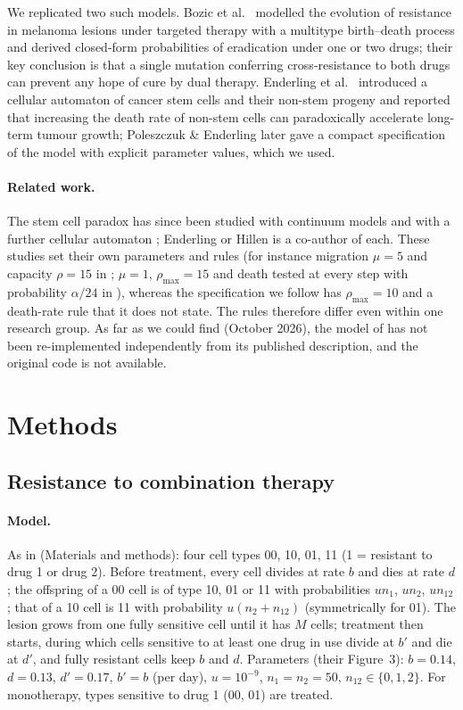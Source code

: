 \documentclass[11pt]{article}
\begin{document}
We replicated two such models. Bozic et al.\ \cite{bozic2013} modelled the evolution of
resistance in melanoma lesions under targeted therapy with a multitype birth--death process
and derived closed-form probabilities of eradication under one or two drugs; their key
conclusion is that a single mutation conferring cross-resistance to both drugs can prevent
any hope of cure by dual therapy. Enderling et al.\ \cite{enderling2009} introduced a
cellular automaton of cancer stem cells and their non-stem progeny and reported that
increasing the death rate of non-stem cells can paradoxically accelerate long-term tumour
growth; Poleszczuk \& Enderling \cite{poleszczuk2014} later gave a compact specification of
the model with explicit parameter values, which we used.

\paragraph{Related work.} The stem cell paradox has since been studied with continuum
models \cite{hillen2013,borsi2017} and with a further cellular automaton
\cite{shyntar2022}; Enderling or Hillen is a co-author of each. These studies set their own
parameters and rules (for instance migration $\mu=5$ and capacity $\rho=15$ in
\cite{hillen2013}; $\mu=1$, $\rho_{\max}=15$ and death tested at every step with
probability $\alpha/24$ in \cite{shyntar2022}), whereas the specification we follow
\cite{poleszczuk2014} has $\rho_{\max}=10$ and a death-rate rule that it does not state. The
rules therefore differ even within one research group. As far as we could find (October
2026), the model of \cite{enderling2009,poleszczuk2014} has not been re-implemented
independently from its published description, and the original code is not available.

\section{Methods}

\subsection{Resistance to combination therapy}
\paragraph{Model.} As in \cite{bozic2013} (Materials and methods): four cell types 00, 10,
01, 11 (1 = resistant to drug 1 or drug 2). Before treatment, every cell divides at rate
$b$ and dies at rate $d$; the offspring of a 00 cell is of type 10, 01 or 11 with
probabilities $u n_1$, $u n_2$, $u n_{12}$; that of a 10 cell is 11 with probability
$u(n_2+n_{12})$ (symmetrically for 01). The lesion grows from one fully sensitive cell
until it has $M$ cells; treatment then starts, during which cells sensitive to at least one
drug in use divide at $b'$ and die at $d'$, and fully resistant cells keep $b$ and $d$.
Parameters (their Figure~3): $b=0.14$, $d=0.13$, $d'=0.17$, $b'=b$ (per day), $u=10^{-9}$,
$n_1=n_2=50$, $n_{12}\in\{0,1,2\}$. For monotherapy, types sensitive to drug 1 (00, 01)
are treated.
\end{document}
